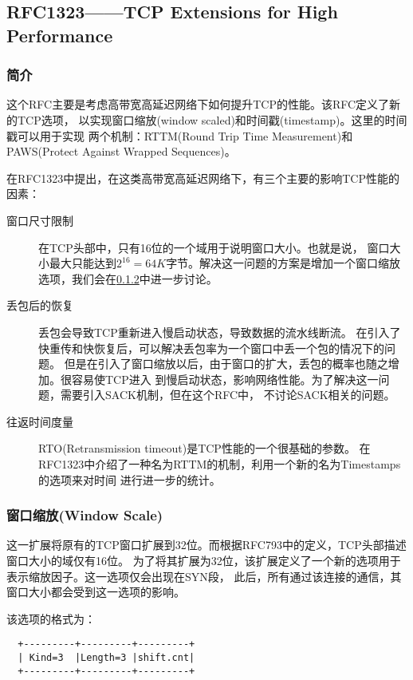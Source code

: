 \subsection{RFC1323——TCP Extensions for High Performance}
\label{subsec:rfc1323}

\subsubsection{简介}
\label{subsubsec:rfc1323_introduce}

这个RFC主要是考虑高带宽高延迟网络下如何提升TCP的性能。该RFC定义了新的TCP选项，
以实现窗口缩放(window scaled)和时间戳(timestamp)。这里的时间戳可以用于实现
两个机制：RTTM(Round Trip Time Measurement)和PAWS(Protect Against Wrapped Sequences)。

在RFC1323中提出，在这类高带宽高延迟网络下，有三个主要的影响TCP性能的因素：
\begin{description}
  \item[窗口尺寸限制] 在TCP头部中，只有16位的一个域用于说明窗口大小。也就是说，
    窗口大小最大只能达到$2^{16}=64K$字节。解决这一问题的方案是增加一个窗口缩放
    选项，我们会在\ref{subsubsec:window_scale}中进一步讨论。
  \item[丢包后的恢复] 丢包会导致TCP重新进入慢启动状态，导致数据的流水线断流。
    在引入了快重传和快恢复后，可以解决丢包率为一个窗口中丢一个包的情况下的问题。
    但是在引入了窗口缩放以后，由于窗口的扩大，丢包的概率也随之增加。很容易使TCP进入
    到慢启动状态，影响网络性能。为了解决这一问题，需要引入SACK机制，但在这个RFC中，
    不讨论SACK相关的问题。
  \item[往返时间度量] RTO(Retransmission timeout)是TCP性能的一个很基础的参数。
    在RFC1323中介绍了一种名为RTTM的机制，利用一个新的名为Timestamps的选项来对时间
    进行进一步的统计。
\end{description}

\subsubsection{窗口缩放(Window Scale)}
\label{subsubsec:window_scale}
这一扩展将原有的TCP窗口扩展到32位。而根据RFC793中的定义，TCP头部描述窗口大小的域仅有16位。
为了将其扩展为32位，该扩展定义了一个新的选项用于表示缩放因子。这一选项仅会出现在SYN段，
此后，所有通过该连接的通信，其窗口大小都会受到这一选项的影响。

该选项的格式为：
\begin{verbatim}
  +---------+---------+---------+ 
  | Kind=3  |Length=3 |shift.cnt| 
  +---------+---------+---------+
\end{verbatim}

